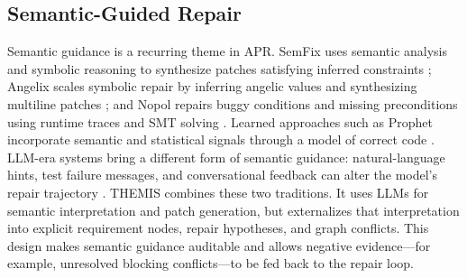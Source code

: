\documentclass[11pt]{article}
\begin{document}
\subsection{Semantic-Guided Repair}
\label{subsec:semantic-guided-repair}

Semantic guidance is a recurring theme in APR.  SemFix uses semantic analysis and symbolic reasoning to synthesize patches satisfying inferred constraints \citep{nguyen-etal-2013-semfix}; Angelix scales symbolic repair by inferring angelic values and synthesizing multiline patches \citep{mechtaev-etal-2016-angelix}; and Nopol repairs buggy conditions and missing preconditions using runtime traces and SMT solving \citep{xuan-etal-2017-nopol}.  Learned approaches such as Prophet incorporate semantic and statistical signals through a model of correct code \citep{long-rinard-2016-prophet}.  LLM-era systems bring a different form of semantic guidance: natural-language hints, test failure messages, and conversational feedback can alter the model's repair trajectory \citep{sobania-etal-2023-chatgpt-bugfixing,xia-etal-2024-chatrepair}.  THEMIS combines these two traditions.  It uses LLMs for semantic interpretation and patch generation, but externalizes that interpretation into explicit requirement nodes, repair hypotheses, and graph conflicts.  This design makes semantic guidance auditable and allows negative evidence---for example, unresolved blocking conflicts---to be fed back to the repair loop.



\end{document}
